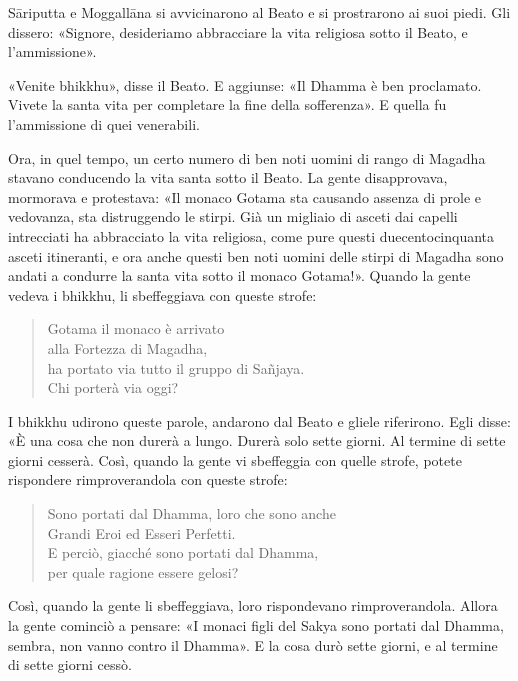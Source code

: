 Sāriputta e Moggallāna si avvicinarono al Beato e si prostrarono ai suoi
piedi. Gli dissero: «Signore, desideriamo abbracciare la vita religiosa
sotto il Beato, e l’ammissione».


«Venite bhikkhu», disse il Beato. E aggiunse: «Il Dhamma è ben
proclamato. Vivete la santa vita per completare la fine della
sofferenza». E quella fu l’ammissione di quei venerabili.


Ora, in quel tempo, un certo numero di ben noti uomini di rango di
Magadha stavano conducendo la vita santa sotto il Beato. La gente
disapprovava, mormorava e protestava: «Il monaco Gotama sta causando
assenza di prole e vedovanza, sta distruggendo le stirpi. Già un
migliaio di asceti dai capelli intrecciati ha abbracciato la vita
religiosa, come pure questi duecentocinquanta asceti itineranti, e ora
anche questi ben noti uomini delle stirpi di Magadha sono andati a
condurre la santa vita sotto il monaco Gotama!». Quando la gente vedeva
i bhikkhu, li sbeffeggiava con queste strofe:


\begin{quote}
Gotama il monaco è arrivato \\
alla Fortezza di Magadha, \\
ha portato via tutto il gruppo di Sañjaya. \\
Chi porterà via oggi?
\end{quote}

I bhikkhu udirono queste parole, andarono dal Beato e gliele riferirono.
Egli disse: «È una cosa che non durerà a lungo. Durerà solo sette
giorni. Al termine di sette giorni cesserà. Così, quando la gente vi
sbeffeggia con quelle strofe, potete rispondere rimproverandola con
queste strofe:


\begin{quote}
Sono portati dal Dhamma, loro che sono anche \\
Grandi Eroi ed Esseri Perfetti. \\
E perciò, giacché sono portati dal Dhamma, \\
per quale ragione essere gelosi?
\end{quote}

Così, quando la gente li sbeffeggiava, loro rispondevano
rimproverandola. Allora la gente cominciò a pensare: «I monaci figli del
Sakya sono portati dal Dhamma, sembra, non vanno contro il Dhamma». E la
cosa durò sette giorni, e al termine di sette giorni cessò.




